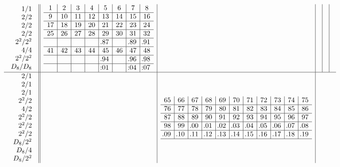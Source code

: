 \documentclass[11pt,a4paper]{amsart}
\begin{document}
\begin{align*}
  \begin{array}{r||c|c|c|c|c}
    \begin{array}{r}
      1/1 \\ 2/2 \\ 2/2 \\ 2/2 \\ 2^2/2^2 \\ 4/4 \\ 2^2/2^2 \\ D_8/D_8 \\
    \end{array}
&
  \begin{array}{c|c|c|c|c|c|c|c}
    1&2&3&4&5&6&7&8\\\hline
9&10&11&12&13&14&15&16\\\hline
17&18&19&20&21&22&23&24\\\hline
25&26&27&28&29&30&31&32\\\hline
&&&&\llap.87&&\llap.89&\llap.91\\\hline
41&42&43&44&45&46&47&48\\\hline
&&&&\llap.94&&\llap.96&\llap.98\\\hline
&&&&\llap:01&&\llap:04&\llap:07\\
  \end{array}
&&&&\\ \hline
    \begin{array}{r}
      2/1 \\ 2/1 \\ 2/1 \\ 2^2/2 \\ 4/2 \\ 2^2/2 \\ 2^2/2 \\ 2^2/2 \\
      D_8/2^2 \\ D_8/4 \\ D_8/2^2 \\
    \end{array}
    &&
       \begin{array}{c|c|c|c|c|c|c|c|c|c|c}
65&66&67&68&69&70&71&72&73&74&75\\\hline
76&77&78&79&80&81&82&83&84&85&86\\\hline
87&88&89&90&91&92&93&94&95&96&97\\\hline
98&99&\llap.00&\llap.01&\llap.02&\llap.03&\llap.04&\llap.05&\llap.06&\llap.07&\llap.08\\\hline
\llap.09&\llap.10&\llap.11&\llap.12&\llap.13&\llap.14&\llap.15&\llap.16&\llap.17&\llap.18&\llap.19\\\hline

\end{array}
\end{array}
\end{align*}
\end{document}
